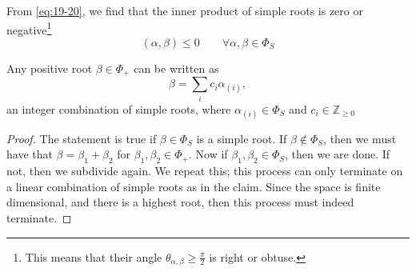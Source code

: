 \begin{corollary}
  \label{cl:19-iii}
  From \eqref{eq:19-20}, we find that the inner product of simple roots is zero or negative\footnote{This means that their angle $\theta_{\alpha, \beta} \geq \frac{\pi}{2}$ is right or obtuse.}
  \begin{equation}
    (\alpha, \beta) \leq 0 \qquad \forall \alpha, \beta \in \Phi_S
  \end{equation}
\end{corollary}
\begin{claim}
  \label{cl:19-4}
  Any positive root $\beta \in \Phi_+$ can be written as
  \begin{equation}
    \beta = \sum_i c_i \alpha_{(i)},
  \end{equation}
  an integer combination of simple roots, where $\alpha_{(i)} \in \Phi_S$ and $c_{i} \in \mathbb{Z}_{\geq 0}$
\end{claim}
\begin{proof}
  The statement is true if $\beta \in \Phi_S$ is a simple root.
  If $\beta \not \in \Phi_S$, then we must have that  $\beta = \beta_1 + \beta_2$ for $\beta_1, \beta_2 \in \Phi_+$.
  Now if $\beta_1, \beta_2 \in \Phi_S$, then we are done. If not, then we subdivide again. We repeat this; this process can only terminate on a linear combination of simple roots as in the claim. Since the space is finite dimensional, and there is a highest root, then this process must indeed terminate.
\end{proof}

